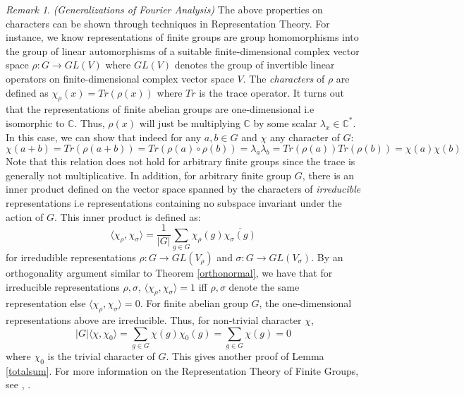 \documentclass{amsart}
\theoremstyle{definition}
\theoremstyle{remark}
\newtheorem{remark}[theorem]{Remark}
\numberwithin{equation}{section}
\theoremstyle{remark}
\begin{document}
\begin{remark}{\emph{(Generalizations of Fourier Analysis)}}
The above properties on characters can be shown through techniques in Representation Theory. For instance, we know representations of finite groups are group homomorphisms into the group of linear automorphisms of a suitable finite-dimensional complex vector space $\rho: G \rightarrow GL(V)$ where $GL(V)$ denotes the group of invertible linear operators on finite-dimensional complex vector space $V$. The \emph{characters} of $\rho$ are defined as $\chi_\rho(x) = Tr(\rho(x))$ where $Tr$ is the trace operator. It turns out that the representations of finite abelian groups are one-dimensional i.e isomorphic to $\mathbb{C}$. Thus, $\rho(x)$ will just be multiplying $\mathbb{C}$ by some scalar $\lambda_x \in \mathbb{C}^*$. In this case, we can show that indeed for any $a,b \in G$ and $\chi$ any character of $G$:
$$ \chi(a+b) = Tr(\rho(a+b)) = Tr(\rho(a)\circ\rho(b)) = \lambda_a \lambda_b = Tr(\rho(a))Tr(\rho(b)) = \chi(a)\chi(b)$$ Note that this relation does not hold for arbitrary finite groups since the trace is generally not multiplicative. In addition, for arbitrary finite group $G$, there is an inner product defined on the vector space spanned by the characters of \emph{irreducible} representations i.e representations containing no subspace invariant under the action of $G$. This inner product is defined as:
%
\[ \langle \chi_{\rho}, \chi_{\sigma} \rangle =
\frac{1}{|G|}\sum_{g \in G} \chi_{\rho}(g)\overline{\chi_{\sigma}(g)}\]
%
for irredudible representations $\rho: G \rightarrow GL(V_\rho)$ and $\sigma: G \rightarrow GL(V_\sigma)$. By an orthogonality argument similar to Theorem \ref{orthonormal}, we have that for irreducible representations $\rho, \sigma$, $ \langle \chi_{\rho}, \chi_{\sigma} \rangle = 1$ iff $\rho, \sigma$ denote the same representation else $\langle \chi_{\rho}, \chi_{\sigma} \rangle = 0$. For finite abelian group $G$, the one-dimensional representations above are irreducible.  Thus, for non-trivial character $\chi$,
%
 \[ |G|\langle \chi, \chi_0 \rangle = \sum_{g \in G} \chi(g)\chi_0(g) = \sum_{g \in G} \chi(g)  = 0 \]
%
where $\chi_0$ is the trivial character of $G$. This gives another proof of Lemma \ref{totalsum}. For more information on the Representation Theory of Finite Groups, see \cite{serre}, \cite{webb}.
\end{remark}
\end{document}
